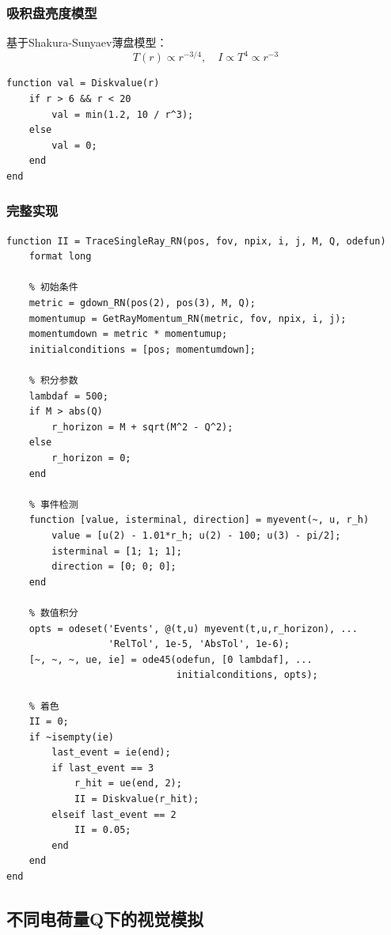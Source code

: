 \documentclass[a4paper,12pt]{article}
\begin{document}
\subsubsection{吸积盘亮度模型}

基于Shakura-Sunyaev薄盘模型：
\begin{equation}
    T(r) \propto r^{-3/4}, \quad I \propto T^4 \propto r^{-3}
\end{equation}

\begin{lstlisting}[caption={吸积盘亮度函数}]
function val = Diskvalue(r)
    if r > 6 && r < 20
        val = min(1.2, 10 / r^3);
    else
        val = 0;
    end
end
\end{lstlisting}

\subsubsection{完整实现}

\begin{lstlisting}[caption={单光线追踪}]
function II = TraceSingleRay_RN(pos, fov, npix, i, j, M, Q, odefun)
    format long
    
    % 初始条件
    metric = gdown_RN(pos(2), pos(3), M, Q);
    momentumup = GetRayMomentum_RN(metric, fov, npix, i, j);
    momentumdown = metric * momentumup;
    initialconditions = [pos; momentumdown];
    
    % 积分参数
    lambdaf = 500;
    if M > abs(Q)
        r_horizon = M + sqrt(M^2 - Q^2);
    else
        r_horizon = 0;
    end
    
    % 事件检测
    function [value, isterminal, direction] = myevent(~, u, r_h)
        value = [u(2) - 1.01*r_h; u(2) - 100; u(3) - pi/2];
        isterminal = [1; 1; 1];
        direction = [0; 0; 0];
    end
    
    % 数值积分
    opts = odeset('Events', @(t,u) myevent(t,u,r_horizon), ...
                  'RelTol', 1e-5, 'AbsTol', 1e-6);
    [~, ~, ~, ue, ie] = ode45(odefun, [0 lambdaf], ...
                              initialconditions, opts);
    
    % 着色
    II = 0;
    if ~isempty(ie)
        last_event = ie(end);
        if last_event == 3
            r_hit = ue(end, 2);
            II = Diskvalue(r_hit);
        elseif last_event == 2
            II = 0.05;
        end
    end
end
\end{lstlisting}

\subsection{不同电荷量Q下的视觉模拟}
\end{document}
